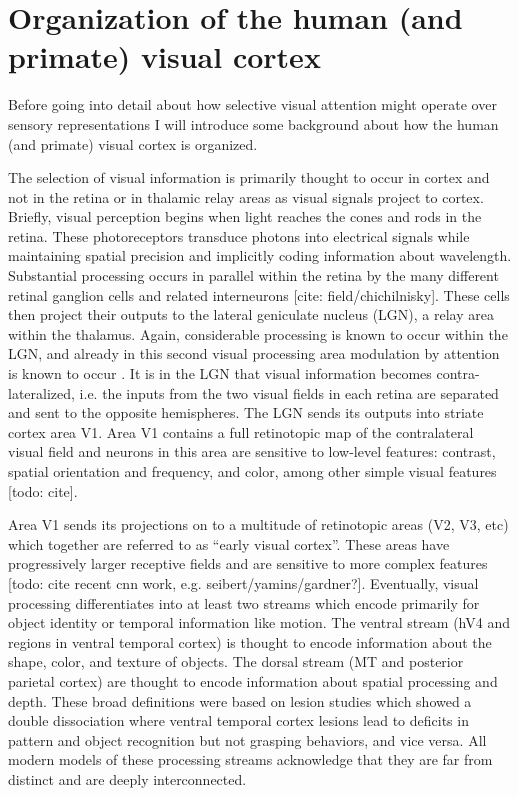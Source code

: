 \section{Organization of the human (and primate) visual cortex}

Before going into detail about how selective visual attention might operate over sensory representations I will introduce some background about how the human (and primate) visual cortex is organized. 

The selection of visual information is primarily thought to occur in cortex and not in the retina or in thalamic relay areas as visual signals project to cortex. Briefly, visual perception begins when light reaches the cones and rods in the retina. These photoreceptors transduce photons into electrical signals while maintaining spatial precision and implicitly coding information about wavelength. Substantial processing occurs in parallel within the retina by the many different retinal ganglion cells and related interneurons [cite: field/chichilnisky]. These cells then project their outputs to the lateral geniculate nucleus (LGN), a relay area within the thalamus. Again, considerable processing is known to occur within the LGN, and already in this second visual processing area modulation by attention is known to occur \citep{OConnor2002-mx}. It is in the LGN that visual information becomes contra-lateralized, i.e. the inputs from the two visual fields in each retina are separated and sent to the opposite hemispheres. The LGN sends its outputs into striate cortex area V1. Area V1 contains a full retinotopic map of the contralateral visual field and neurons in this area are sensitive to low-level features: contrast, spatial orientation and frequency, and color, among other simple visual features [todo: cite].

Area V1 sends its projections on to a multitude of retinotopic areas (V2, V3, etc) which together are referred to as ``early visual cortex''. These areas have progressively larger receptive fields \citep{Dumoulin2008-uc} and are sensitive to more complex features [todo: cite recent cnn work, e.g. seibert/yamins/gardner?]. Eventually, visual processing differentiates into at least two streams \citep{Mishkin1983-ys} which encode primarily for object identity or temporal information like motion. The ventral stream (hV4 and regions in ventral temporal cortex) is thought to encode information about the shape, color, and texture of objects. The dorsal stream (MT and posterior parietal cortex) are thought to encode information about spatial processing and depth. These broad definitions were based on lesion studies which showed a double dissociation where ventral temporal cortex lesions lead to deficits in pattern and object recognition but not grasping behaviors, and vice versa. All modern models of these processing streams acknowledge that they are far from distinct and are deeply interconnected.

